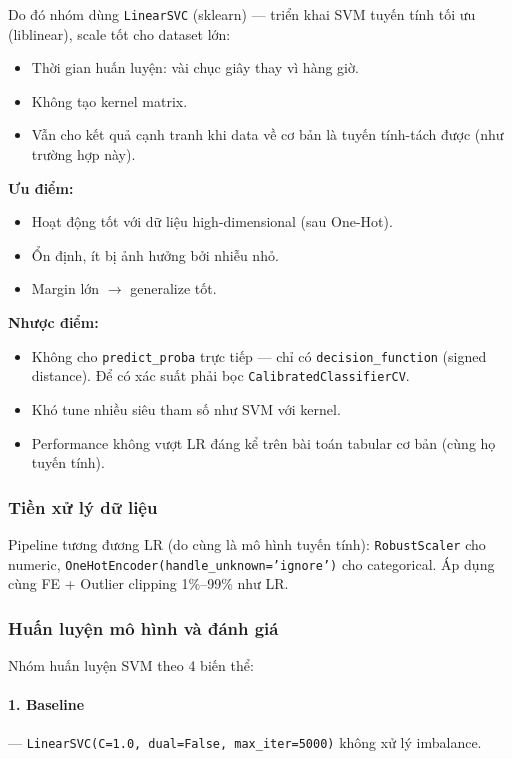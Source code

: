 \documentclass[12pt, a4paper]{article}
\begin{document}
Do đó nhóm dùng \texttt{LinearSVC} (sklearn) --- triển khai SVM tuyến tính tối ưu (liblinear), scale tốt cho dataset lớn:
\begin{itemize}
    \item Thời gian huấn luyện: vài chục giây thay vì hàng giờ.
    \item Không tạo kernel matrix.
    \item Vẫn cho kết quả cạnh tranh khi data về cơ bản là tuyến tính-tách được (như trường hợp này).
\end{itemize}

\textbf{Ưu điểm:}
\begin{itemize}
    \item Hoạt động tốt với dữ liệu high-dimensional (sau One-Hot).
    \item Ổn định, ít bị ảnh hưởng bởi nhiễu nhỏ.
    \item Margin lớn $\to$ generalize tốt.
\end{itemize}

\textbf{Nhược điểm:}
\begin{itemize}
    \item Không cho \texttt{predict\_proba} trực tiếp --- chỉ có \texttt{decision\_function} (signed distance). Để có xác suất phải bọc \texttt{CalibratedClassifierCV}.
    \item Khó tune nhiều siêu tham số như SVM với kernel.
    \item Performance không vượt LR đáng kể trên bài toán tabular cơ bản (cùng họ tuyến tính).
\end{itemize}

\subsubsection{Tiền xử lý dữ liệu}

Pipeline tương đương LR (do cùng là mô hình tuyến tính): \texttt{RobustScaler} cho numeric, \texttt{OneHotEncoder(handle\_unknown='ignore')} cho categorical. Áp dụng cùng FE + Outlier clipping 1\%--99\% như LR.

\subsubsection{Huấn luyện mô hình và đánh giá}

Nhóm huấn luyện SVM theo 4 biến thể:

\paragraph{1. Baseline} --- \texttt{LinearSVC(C=1.0, dual=False, max\_iter=5000)} không xử lý imbalance.
\end{document}
